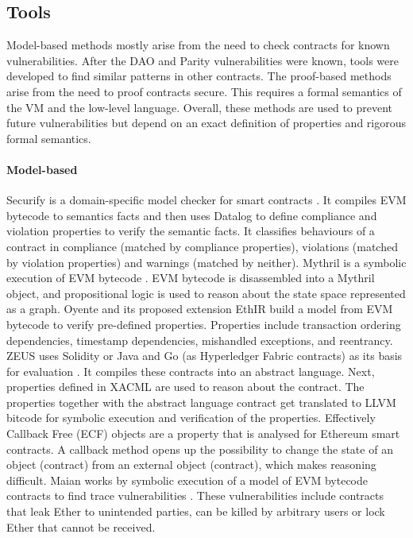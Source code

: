 


\subsection{Tools}
Model-based methods mostly arise from the need to check contracts for known vulnerabilities. After the DAO and Parity vulnerabilities were known, tools were developed to find similar patterns in other contracts. The proof-based methods arise from the need to proof contracts secure. This requires a formal semantics of the VM and the low-level language. Overall, these methods are used to prevent future vulnerabilities but depend on an exact definition of properties and rigorous formal semantics.

\paragraph{Model-based}
Securify is a domain-specific model checker for smart contracts \cite{Tsankov2017}. It compiles EVM bytecode to semantics facts and then uses Datalog to define compliance and violation properties to verify the semantic facts. It classifies behaviours of a contract in compliance (matched by compliance properties), violations (matched by violation properties) and warnings (matched by neither). 
Mythril is a symbolic execution of EVM bytecode \cite{Mueller2018}. EVM bytecode is disassembled into a Mythril object, and propositional logic is used to reason about the state space represented as a graph. 
Oyente \cite{Luu2016} and its proposed extension EthIR \cite{Albert2018} build a model from EVM bytecode to verify pre-defined properties. Properties include transaction ordering dependencies, timestamp dependencies, mishandled exceptions, and reentrancy.
ZEUS uses Solidity or Java and Go (as Hyperledger Fabric contracts) as its basis for evaluation \cite{Kalra2018}. It compiles these contracts into an abstract language. Next, properties defined in XACML are used to reason about the contract. The properties together with the abstract language contract get translated to LLVM bitcode for symbolic execution and verification of the properties.
Effectively Callback Free (ECF) objects are a property that is analysed for Ethereum smart contracts\cite{Grossman2017}. A callback method opens up the possibility to change the state of an object (contract) from an external object (contract), which makes reasoning difficult. 
Maian works by symbolic execution of a model of EVM bytecode contracts to find trace vulnerabilities \cite{Nikolic2018}. These vulnerabilities include contracts that leak Ether to unintended parties, can be killed by arbitrary users or lock Ether that cannot be received. 

